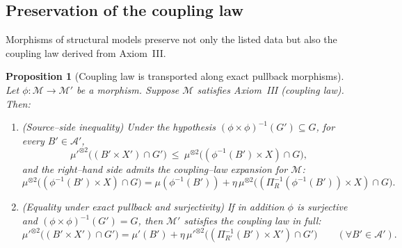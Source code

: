 \documentclass[11pt]{article}
\numberwithin{equation}{section}
\newtheorem{proposition}[theorem]{Proposition}
\theoremstyle{definition}
\begin{document}
\subsection{Preservation of the coupling law}

Morphisms of structural models preserve not only the listed data but also the coupling law derived from Axiom~III.

\begin{proposition}[Coupling law is transported along exact pullback morphisms]\label{prop:coupling-preserved}
Let $\phi:\mathcal M\to\mathcal M'$ be a morphism. Suppose $\mathcal M$ satisfies Axiom~III (coupling law). Then:
\begin{enumerate}[label=\emph{(\roman*)},nosep]
\item \emph{(Source--side inequality)} Under the hypothesis $(\phi\times\phi)^{-1}(G')\subseteq G$, for every $B'\in\mathcal A'$,
\[
\mu'^{\otimes2}\bigl((B'\times X')\cap G'\bigr)\ \le\ \mu^{\otimes2}\bigl((\phi^{-1}(B')\times X)\cap G\bigr),
\]
and the right--hand side admits the coupling--law expansion for $\mathcal M$:
\[
\mu^{\otimes2}\bigl((\phi^{-1}(B')\times X)\cap G\bigr)=\mu(\phi^{-1}(B'))+\eta\,\mu^{\otimes2}\bigl((\Pi_R^{-1}(\phi^{-1}(B'))\times X)\cap G\bigr).
\]
\item \emph{(Equality under exact pullback and surjectivity)} If in addition $\phi$ is surjective and $(\phi\times\phi)^{-1}(G')=G$, then $\mathcal M'$ satisfies the coupling law in full:
\[
\mu'^{\otimes2}\bigl((B'\times X')\cap G'\bigr)=\mu'(B')+\eta\,\mu'^{\otimes2}\bigl((\Pi_{R'}^{-1}(B')\times X')\cap G'\bigr)\qquad(\forall B'\in\mathcal A').
\]
\end{enumerate}
\end{proposition}
\end{document}
